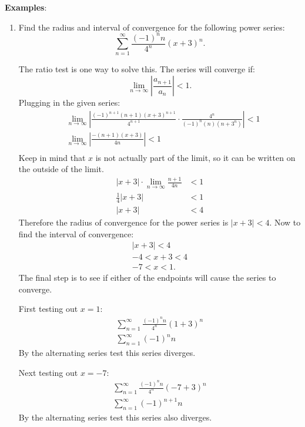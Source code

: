 \documentclass[12pt]{article}
\begin{document}
\noindent \textbf{Examples}:
\begin{enumerate}
	\item Find the radius and interval of convergence for the following power series:
	      \[ \sum_{n=1}^\infty \frac{(-1)^n n}{4^n} (x+3)^n. \]

	      The ratio test is one way to solve this. The series will converge if:
	      \[ \lim_{n \to \infty} \left| \frac{a_{n+1}}{a_n} \right| < 1. \]
	      Plugging in the given series:
	      \begin{align*}
		      & \lim_{n \to \infty} \left| \frac{(-1)^{n+1}(n+1)(x+3)^{n+1}}{4^{n+1}} \cdot \frac{4^n}{(-1)^n (n)(n+3^n)} \right| < 1 \\[6pt]
		      & \lim_{n \to \infty} \left| \frac{-(n+1)(x+3)}{4n} \right| < 1                                                         \\[6pt]
	      \end{align*}
	      Keep in mind that $x$ is not actually part of the limit, so it can be written on the outside of the limit.
	      \begin{align*}
		      |x+3| \cdot \lim_{n \to \infty} \frac{n+1}{4n} & < 1 \\[6pt]
		      \frac{1}{4} |x+3|                              & < 1 \\[6pt]
		      |x+3|                                          & < 4
	      \end{align*}
	      Therefore the radius of convergence for the power series is $|x+3| < 4$. Now to find the interval of convergence:
	      \begin{gather*}
		      |x+3| < 4 \\
		      -4 < x+3 < 4 \\
		      -7 < x < 1.
	      \end{gather*}
	      The final step is to see if either of the endpoints will cause the series to converge.

	      First testing out $x=1$:
	      \begin{gather*}
		      \sum_{n=1}^\infty \frac{(-1)^n n}{4^n} (1+3)^n \\[6pt]
		      \sum_{n=1}^\infty (-1)^n n
	      \end{gather*}
	      By the alternating series test this series diverges.

	      Next testing out $x=-7$:
	      \begin{align*}
		      \sum_{n=1}^\infty \frac{(-1)^n n}{4^n} (-7+3)^n \\[6pt]
		      \sum_{n=1}^\infty (-1)^{n+1} n
	      \end{align*}
	      By the alternating series test this series also diverges.


\end{enumerate}
\end{document}
